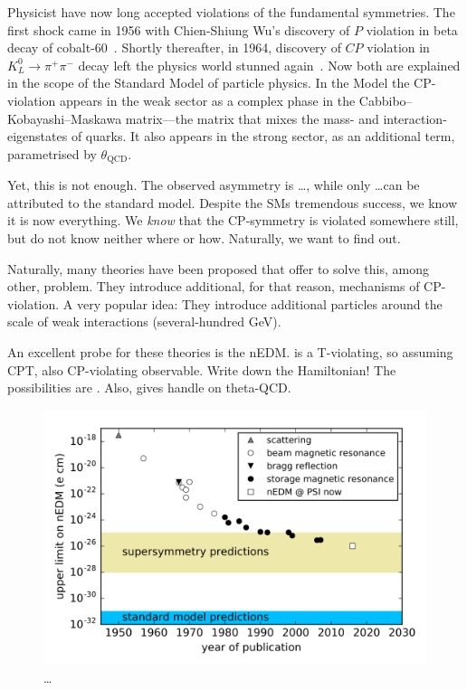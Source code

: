 Physicist have now long accepted violations of the fundamental symmetries.
The first shock came in 1956 with Chien-Shiung Wu's discovery of $P$ violation in beta decay of cobalt-60~\cite{PhysRev.105.1413}. Shortly thereafter, in 1964, discovery of $CP$ violation in $K^0_L \rightarrow \pi^+ \pi^-$ decay left the physics world stunned again~\cite{PhysRevLett.13.138}. Now both are explained in the scope of the Standard Model of particle physics. In the Model the CP-violation appears in the weak sector as a complex phase in the Cabbibo--Kobayashi--Maskawa matrix---the matrix that mixes the mass- and interaction-eigenstates of quarks. It also appears in the strong sector, as an additional term, parametrised by $\theta_\text{QCD}$. 

Yet, this is not enough. \cite{Pospelov2005} The observed asymmetry is \ldots, while only \ldots can be attributed to the standard model. Despite the SMs tremendous success, we know it is now everything. We \emph{know} that the CP-symmetry is violated somewhere still, but do not know neither where or how. Naturally, we want to find out.

Naturally, many theories have been proposed that offer to solve this, among other, problem. They introduce additional, for that reason, mechanisms of CP-violation. A very popular idea: They introduce additional particles around the scale of weak interactions (several-hundred GeV).

An excellent probe for these theories is the nEDM. is a T-violating, so assuming CPT, also CP-violating observable. Write down the Hamiltonian!
The possibilities are \cite{Ellis1989}.
Also, gives handle on theta-QCD.

\begin{figure}
  \centering
  \includegraphics[width=\linewidth]{gfx/introduction/limits.png}
  \caption{\ldots {}  }
  \label{fig:nEDM_limits_history}
\end{figure}

